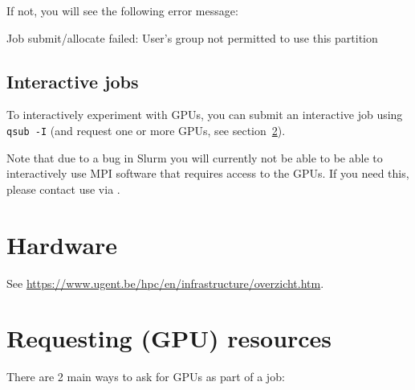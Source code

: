  If not, you will see the following error message:


\begin{prompt}
Job submit/allocate failed: User's group not permitted to use this partition
\end{prompt}

\subsection{Interactive jobs}
\label{sec:gpu_ugent_interactive_jobs}

To interactively experiment with GPUs, you can submit an interactive job using \lstinline|qsub -I| (and request
one or more GPUs, see section~\ref{sec:gpu_ugent_resources}).

Note that due to a bug in Slurm you will currently not be able to be able to interactively use
MPI software that requires access to the GPUs. If you need this, please contact use via \hpcinfo.



\section{Hardware}

See \url{https://www.ugent.be/hpc/en/infrastructure/overzicht.htm}.




\section{Requesting (GPU) resources}
\label{sec:gpu_ugent_resources}

There are 2 main ways to ask for GPUs as part of a job:

